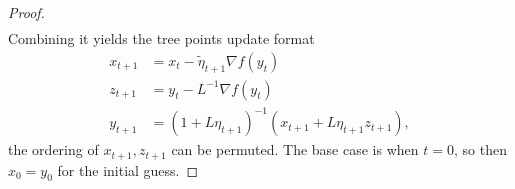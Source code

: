 \begin{proof}
\begin{align*}
            \end{align*}
            Combining it yields the tree points update format 
            \begin{align*}
                x_{t + 1} &= x_t - \tilde \eta_{t + 1} \nabla f(y_t) 
                \\
                z_{t + 1} &= y_t - L^{-1} \nabla f(y_t) 
                \\
                y_{t + 1} &= 
                (1 + L\eta_{t + 1})^{-1}
                (
                x_{t + 1} + L\eta_{t + 1}z_{t + 1}
                ), 
            \end{align*}
            the ordering of $x_{t +1}, z_{t + 1}$ can be permuted. 
            The base case is when $t = 0$, so then $x_0 = y_0$ for the initial guess.
        \end{proof}
